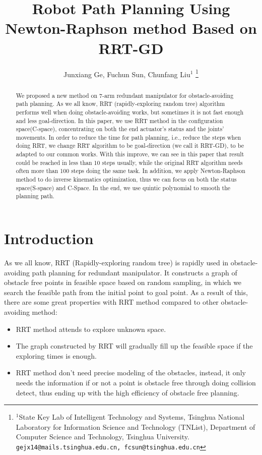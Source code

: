 \documentclass[letterpaper, 10 pt, conference]{ieeeconf}  %
\title{\LARGE \bf
Robot Path Planning Using Newton-Raphson method Based on RRT-GD
}
\author{Junxiang Ge, Fuchun Sun, Chunfang Liu$^{1}$%
\thanks{$^{1}$State Key Lab of Intelligent Technology and Systems, Tsinghua National Laboratory for Information Science and Technology (TNList), Department of Computer Science and Technology, Tsinghua University.
        {\tt\small gejx14@mails.tsinghua.edu.cn, fcsun@tsinghua.edu.cn}}%
}
\begin{document}
\maketitle
\thispagestyle{empty}
\pagestyle{empty}


\begin{abstract}

We proposed a new method on 7-arm redundant manipulator for obstacle-avoiding path planning. As we all know, RRT (rapidly-exploring random tree) algorithm performs well when doing obstacle-avoiding works, but sometimes it is not fast enough and less goal-direction. In this paper, we use RRT method in the configuration space(C-space), concentrating on both the end actuator’s status and the joints’ movements. In order to reduce the time for path planning, i.e., reduce the steps when doing RRT, we change RRT algorithm to be goal-direction (we call it RRT-GD), to be adapted to our common works. With this improve, we can see in this paper that result could be reached in less than 10 steps usually, while the original RRT algorithm needs often more than 100 steps doing the same task. In addition, we apply Newton-Raphson method to do inverse kinematics optimization, thus we can focus on both the status space(S-space) and C-Space. In the end, we use quintic polynomial to smooth the planning path.

\end{abstract}


\section{Introduction}

As we all know, RRT (Rapidly-exploring random tree) is rapidly used in obstacle-avoiding path planning for redundant manipulator. It constructs a graph of obstacle free points in feasible space based on random sampling, in which we search the feasible path from the initial point to goal point. As a result of this, there are some great properties with RRT method compared to other obstacle-avoiding method:
\begin{itemize}
\item RRT method attends to explore unknown space. 
\item The graph constructed by RRT will gradually fill up the feasible space if the exploring times is enough.
\item RRT method don't need precise modeling of the obstacles, instead, it only needs the information if or not a point is obstacle free through doing collision detect, thus ending up with the high efficiency of obstacle free planning.
\end{itemize}
\end{document}
